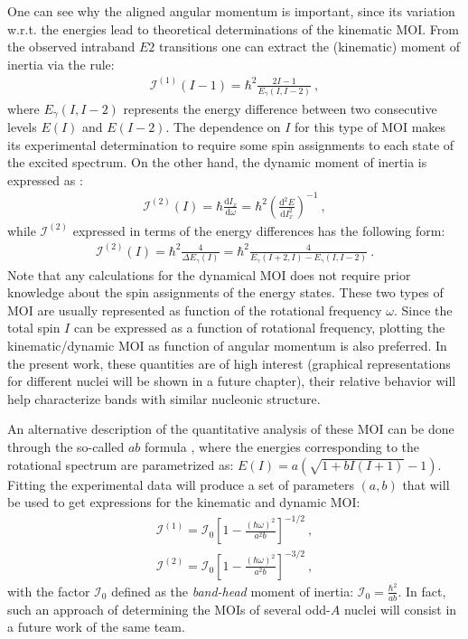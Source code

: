 One can see why the aligned angular momentum is important, since its variation w.r.t. the energies lead to theoretical determinations of the kinematic MOI. From the observed intraband $E2$ transitions one can extract the (kinematic) moment of inertia via the rule:
\begin{align}
    \mathcal{I}^{(1)}(I-1)=\hbar^2\frac{2I-1}{E_\gamma(I,I-2)}\ ,
    \label{kinematic-moi-energy-levels}
\end{align}
where $E_\gamma(I,I-2)$ represents the energy difference between two consecutive levels $E(I)$ and $E(I-2)$. The dependence on $I$ for this type of MOI makes its experimental determination to require some spin assignments to each state of the excited spectrum. On the other hand, the dynamic moment of inertia is expressed as \cite{wu1992relation}:
\begin{align}
    \mathcal{I}^{(2)}(I)=\hbar\frac{\text{d}I_x}{\text{d}\omega}=\hbar^2\left(\frac{\text{d}^2E}{\text{d}I_x^2}\right)^{-1}\ ,
    \label{dynamic-moi-general}
\end{align}
while $\mathcal{I}^{(2)}$ expressed in terms of the energy differences has the following form:
\begin{align}
    \mathcal{I}^{(2)}(I)=\hbar^2\frac{4}{\Delta E_\gamma(I)}=\hbar^2\frac{4}{E_\gamma(I+2,I)-E_\gamma(I,I-2)}\ .
    \label{dynamic-moi-energy-levels}
\end{align}
Note that any calculations for the dynamical MOI does not require prior knowledge about the spin assignments of the energy states. These two types of MOI are usually represented as function of the rotational frequency $\omega$. Since the total spin $I$ can be expressed as a function of rotational frequency, plotting the kinematic/dynamic MOI as function of angular momentum is also preferred. In the present work, these quantities are of high interest (graphical representations for different nuclei will be shown in a future chapter), their relative behavior will help characterize bands with similar nucleonic structure.

An alternative description of the quantitative analysis of these MOI can be done through the so-called $ab$ formula \cite{wu1992relation,wu1992spin}, where the energies corresponding to the rotational spectrum are parametrized as: $E(I)=a\left(\sqrt{1+bI(I+1)}-1\right)$. Fitting the experimental data will produce a set of parameters $(a,b)$ that will be used to get expressions for the kinematic and dynamic MOI:
\begin{align}
    \mathcal{I}^{(1)}=\mathcal{I}_0\left[1-\frac{(\hbar\omega)^2}{a^2b}\right]^{-1/2}\ ,\\
    \mathcal{I}^{(2)}=\mathcal{I}_0\left[1-\frac{(\hbar\omega)^2}{a^2b}\right]^{-3/2}\ ,
\end{align}
with the factor $\mathcal{I}_0$ defined as the \emph{band-head} moment of inertia: $\mathcal{I}_0=\frac{\hbar^2}{ab}$. In fact, such an approach of determining the MOIs of several odd-$A$ nuclei will consist in a future work of the same team.

